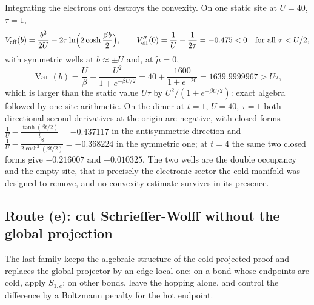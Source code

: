\documentclass[11pt]{article}
\theoremstyle{definition}
\theoremstyle{remark}
\begin{document}
Integrating the electrons out destroys the convexity. On one static site at
$U=40$, $\tau=1$,
\begin{equation}
V_{\mathrm{eff}}(b)=\frac{b^{2}}{2U}-2\tau\ln\Bigl(2\cosh\frac{\beta b}{2}\Bigr),
\qquad V_{\mathrm{eff}}''(0)=\frac1U-\frac{1}{2\tau}=-0.475<0
\quad\text{for all }\tau<U/2,
\label{eq:veff}
\end{equation}
with symmetric wells at $b\approx\pm U$ and, at $\tilde\mu=0$,
\begin{equation}
\operatorname{Var}(b)=\frac{U}{\beta}+\frac{U^{2}}{1+e^{-\beta U/2}}
=40+\frac{1600}{1+e^{-20}}=1639.9999967>U\tau,
\label{eq:varb}
\end{equation}
which is larger than the static value $U\tau$ by $U^{2}/(1+e^{-\beta U/2})$: exact
algebra followed by one-site arithmetic. On the dimer at $t=1$, $U=40$, $\tau=1$
both directional second derivatives at the origin are negative, with closed forms
$\frac1U-\frac{\tanh(\beta t/2)}{t}=-0.437117$ in the antisymmetric direction and
$\frac1U-\frac{\beta}{2\cosh^{2}(\beta t/2)}=-0.368224$ in the symmetric one; at
$t=4$ the same two closed forms give $-0.216007$ and $-0.010325$. The two wells are the
double occupancy and the empty site, that is precisely the electronic sector the
cold manifold was designed to remove, and no convexity estimate survives in its
presence.

\subsection{Route (e): cut Schrieffer-Wolff without the global projection}\label{sub:routee}

The last family keeps the algebraic structure of the cold-projected proof and
replaces the global projector by an edge-local one: on a bond whose endpoints are
cold, apply $S_{1,e}$; on other bonds, leave the hopping alone, and control the
difference by a Boltzmann penalty for the hot endpoint.
\end{document}
